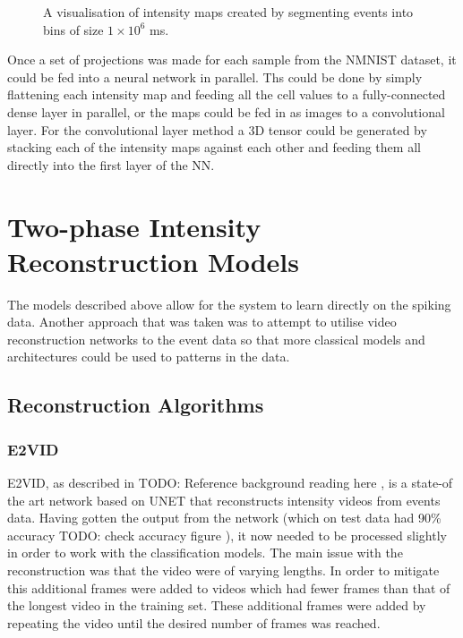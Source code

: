 \begin{figure}[htb]
    \caption{A visualisation of intensity maps created by segmenting events into bins of size $ 1 \times 10^6 $ ms.}%
    \label{fig:nmnist_spikes_to_intensity_map}%
\end{figure}

Once a set of projections was made for each sample from the NMNIST dataset, it could be fed into a neural network in parallel. Ths could be done by simply flattening each intensity map and feeding all the cell values to a fully-connected dense layer in parallel, or the maps could be fed in as images to a convolutional layer. For the convolutional layer method a 3D tensor could be generated by stacking each of the intensity maps against each other and feeding them all directly into the first layer of the NN.

\section{Two-phase Intensity Reconstruction Models}

The models described above allow for the system to learn directly on the spiking data. Another approach that was taken was to attempt to utilise video reconstruction networks to the event data so that more classical models and architectures could be used to patterns in the data.

\subsection{Reconstruction Algorithms}

\subsubsection{E2VID}

E2VID, as described in \color{red} TODO: Reference background reading here \color{black}, is a state-of the art network based on UNET that reconstructs intensity videos from events data. Having gotten the output from the network (which on test data had 90\% accuracy \color{red} TODO: check accuracy figure \color{black}), it now needed to be processed slightly in order to work with the classification models. The main issue with the reconstruction was that the video were of varying lengths. In order to mitigate this additional frames were added to videos which had fewer frames than that of the longest video in the training set. These additional frames were added by repeating the video until the desired number of frames was reached.

